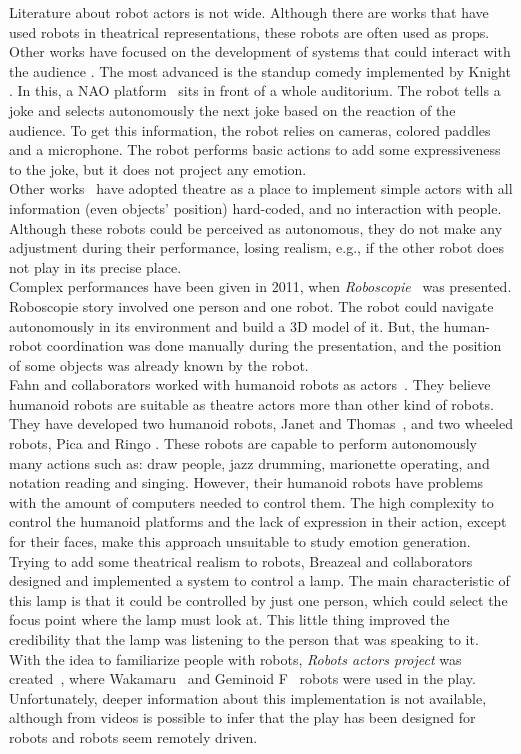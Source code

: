 Literature about robot actors is not wide. Although there are works that have used robots in theatrical representations, these robots are often used as props. Other works have focused on the development of systems that could interact with the audience \cite{Mavridis2009,Breazeal2003}. The most advanced is the standup comedy implemented by Knight \cite{Knight2011b,Knight2011}. In this, a NAO platform~\cite{NAO2013} sits in front of a whole auditorium. The robot tells a joke and selects autonomously the next joke based on the reaction of the audience. To get this information, the robot relies on cameras, colored paddles and a microphone. The robot performs basic actions to add some expressiveness to the joke, but it does not project any emotion.\\
Other works~\cite{Wurst2002,Bruce2002} have adopted theatre as a place to implement simple actors with all information (even objects' position) hard-coded, and no interaction with people. Although these robots could be perceived as autonomous, they do not make any adjustment during their performance, losing realism, e.g., if the other robot does not play in its precise place. \\
Complex performances have been given in 2011, when \textit{Roboscopie}~\cite{Roboscopie2012,Lemaignan2012} was presented. Roboscopie story involved one person and one robot. The robot could navigate autonomously in its environment and build a 3D model of it. But, the human-robot coordination was done manually during the presentation, and the position of some objects was already known by the robot.\\
Fahn and collaborators worked with humanoid robots as actors~\cite{Fan2009,Fan2013}. They believe humanoid robots are suitable as theatre actors more than other kind of robots. They have developed two humanoid robots, Janet and Thomas~\cite{Fan2009}, and two wheeled robots, Pica and Ringo \cite{Hsu2007}. These robots are capable to perform autonomously many actions such as: draw people, jazz drumming, marionette operating, and notation reading and singing. However, their humanoid robots have problems with the amount of computers needed to control them. The high complexity to control the humanoid platforms and the lack of expression in their action, except for their faces, make this approach unsuitable to study emotion generation.\\
Trying to add some theatrical realism to robots, Breazeal and collaborators~\cite{Breazeal2008} designed and implemented a system to control a lamp. The main characteristic of this lamp is that it could be controlled by just one person, which could select the focus point where the lamp must look at. This little thing improved the credibility that the lamp was listening to the person that was speaking to it.\\
With the idea to familiarize people with robots, \textit{Robots actors project} was created~\cite{Zaven2012,Torres2013}, where Wakamaru~\cite{Wakamaru2013} and Geminoid F~\cite{Ishiguro2013} robots were used in the play. Unfortunately, deeper information about this implementation is not available, although from videos is possible to infer that the play has been designed for robots and robots seem remotely driven.